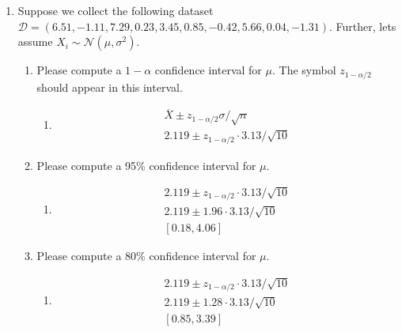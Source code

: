 \documentclass[krantz1,ChapterTOCs]{krantz}
\begin{document}
\begin{enumerate}
\begin{enumerate}
{            } 
        \end{enumerate}

    \clearpage
    \item Suppose we collect the following dataset $\mathcal{D} = ( 6.51, -1.11,  7.29,  0.23,  3.45,  0.85, -0.42,  5.66,  0.04, -1.31 )$. Further, lets assume $X_{i} \sim \mathcal{N}(\mu,\sigma^{2})$.
    \begin{enumerate}
        \item Please compute a $1-\alpha$ confidence interval for $\mu$. The symbol $z_{1-\alpha/2}$ should appear in this interval. 
        \begin{enumerate}
            \item {
            \color{red} 
                \begin{align}
                    \overline{X} \pm z_{1-\alpha/2} \sigma/\sqrt{n} \\ 
                       2.119 \pm z_{1-\alpha/2} \cdot  3.13/\sqrt{10}
                \end{align}
            } 
        \end{enumerate}

        \item Please compute a 95\% confidence interval for $\mu$.
        \begin{enumerate}
            \item {
            \color{red} 
            \begin{align}
                 2.119 \pm z_{1-\alpha/2}\cdot 3.13/\sqrt{10}\\
                 2.119 \pm 1.96 \cdot 3.13/\sqrt{10}\\
                 [0.18, 4.06]
            \end{align}
            } 
        \end{enumerate}

        \item Please compute a 80\% confidence interval for $\mu$.
        \begin{enumerate}
            \item {
            \color{red} 
               \begin{align}
                   2.119 \pm z_{1-\alpha/2} \cdot 3.13/\sqrt{10}\\
                   2.119 \pm 1.28 \cdot 3.13/\sqrt{10}\\
                 [0.85, 3.39]
               \end{align}
            } 
        \end{enumerate}


\end{enumerate}
\end{enumerate}
\end{document}

